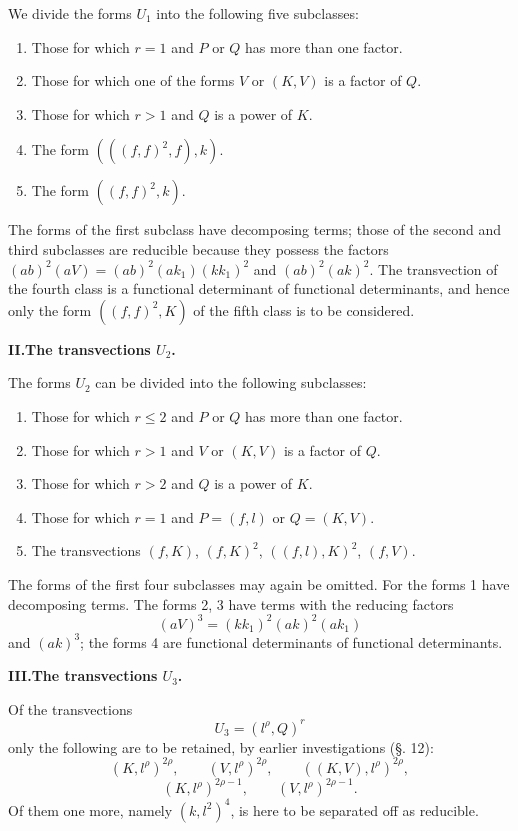 \documentclass[10pt]{article}
\begin{document}
We divide the forms $U_1$ into the following five subclasses:
\begin{enumerate}
\item Those for which $r=1$ and $P$ or $Q$ has more than one factor.
\item Those for which one of the forms $V$ or $(K,V)$ is a factor of $Q$.
\item Those for which $r>1$ and $Q$ is a power of $K$.
\item The form $(((f,f)^2,f),k)$.
\item The form $((f,f)^2,k)$.
\end{enumerate}
The forms of the first subclass have decomposing terms; those of the second and third subclasses are reducible because they possess the factors $(ab)^2(aV)=(ab)^2(ak_1)(kk_1)^2$ and $(ab)^2(ak)^2$. The transvection of the fourth class is a functional determinant of functional determinants, and hence only the form $((f,f)^2,K)$ of the fifth class is to be considered.

\begin{center}
{\bfseries II.\quad The transvections $U_2$.}
\end{center}

The forms $U_2$ can be divided into the following subclasses:
\begin{enumerate}
\item Those for which $r\leq2$ and $P$ or $Q$ has more than one factor.
\item Those for which $r>1$ and $V$ or $(K,V)$ is a factor of $Q$.
\item Those for which $r>2$ and $Q$ is a power of $K$.
\item Those for which $r=1$ and $P=(f,l)$ or $Q=(K,V)$.
\item The transvections $(f,K)$, $(f,K)^2$, $((f,l),K)^2$, $(f,V)$.
\end{enumerate}
The forms of the first four subclasses may again be omitted. For the forms 1 have decomposing terms. The forms 2, 3 have terms with the reducing factors
\[
(aV)^3=(kk_1)^2(ak)^2(ak_1)
\]
and $(ak)^3$; the forms 4 are functional determinants of functional determinants.

\begin{center}
{\bfseries III.\quad The transvections $U_3$.}
\end{center}

Of the transvections
\[
U_3=(l^\rho,Q)^r
\]
only the following are to be retained, by earlier investigations (§. 12):
\[
(K,l^\rho)^{2\rho},
\qquad (V,l^\rho)^{2\rho},
\qquad ((K,V),l^\rho)^{2\rho},
\]
\[
(K,l^\rho)^{2\rho-1},
\qquad (V,l^\rho)^{2\rho-1}.
\]
Of them one more, namely $(k,l^2)^4$, is here to be separated off as reducible.
\end{document}
